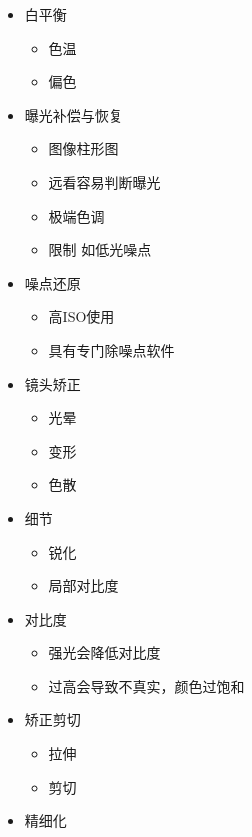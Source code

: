 \documentclass[
  letterpaper,
  DIV=11,
  numbers=noendperiod]{scrreprt}
\providecommand{\tightlist}{%
  \setlength{\itemsep}{0pt}\setlength{\parskip}{0pt}}\usepackage{longtable,booktabs,array}
\begin{document}
\begin{itemize}
\tightlist
\item
  白平衡

  \begin{itemize}
  \tightlist
  \item
    色温
  \item
    偏色
  \end{itemize}
\item
  曝光补偿与恢复

  \begin{itemize}
  \tightlist
  \item
    图像柱形图
  \item
    远看容易判断曝光
  \item
    极端色调
  \item
    限制 如低光噪点
  \end{itemize}
\item
  噪点还原

  \begin{itemize}
  \tightlist
  \item
    高ISO使用
  \item
    具有专门除噪点软件
  \end{itemize}
\item
  镜头矫正

  \begin{itemize}
  \tightlist
  \item
    光晕
  \item
    变形
  \item
    色散
  \end{itemize}
\item
  细节

  \begin{itemize}
  \tightlist
  \item
    锐化
  \item
    局部对比度
  \end{itemize}
\item
  对比度

  \begin{itemize}
  \tightlist
  \item
    强光会降低对比度
  \item
    过高会导致不真实，颜色过饱和
  \end{itemize}
\item
  矫正剪切

  \begin{itemize}
  \tightlist
  \item
    拉伸
  \item
    剪切
  \end{itemize}
\item
  精细化


\end{itemize}
\end{document}

